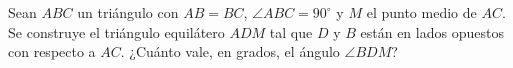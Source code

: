 Sean $ABC$ un triángulo con $AB = BC$, $\angle ABC = 90^\circ$ y $M$ el punto medio de $AC$. Se construye el triángulo equilátero $ADM$ tal que $D$ y $B$ están en lados opuestos con respecto a $AC$. ¿Cuánto vale, en grados, el ángulo $\angle BDM$?